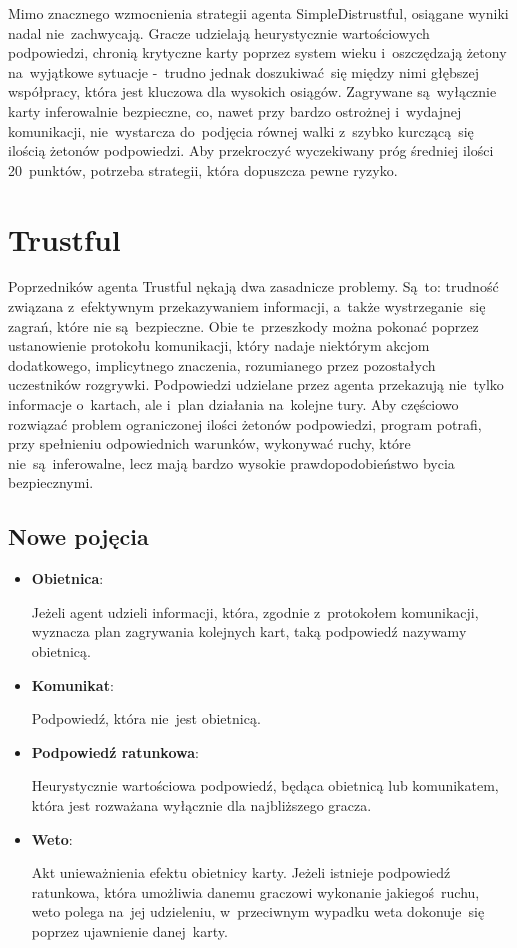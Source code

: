 \documentclass[declaration,shortabstract,inz]{iithesis}
\begin{document}
Mimo znacznego wzmocnienia strategii agenta SimpleDistrustful, osiągane wyniki nadal nie~zachwycają. Gracze udzielają heurystycznie wartościowych podpowiedzi, chronią krytyczne karty poprzez system wieku i~oszczędzają żetony na~wyjątkowe sytuacje -~trudno jednak doszukiwać~się między nimi głębszej współpracy, która jest kluczowa dla wysokich osiągów. Zagrywane są~wyłącznie karty inferowalnie bezpieczne, co, nawet przy bardzo ostrożnej i~wydajnej komunikacji, nie~wystarcza do~podjęcia równej walki z~szybko kurczącą~się ilością żetonów podpowiedzi. Aby przekroczyć wyczekiwany próg średniej ilości 20~punktów, potrzeba strategii, która dopuszcza pewne ryzyko.

\section{Trustful}

Poprzedników agenta Trustful nękają dwa zasadnicze problemy. Są~to: trudność związana z~efektywnym przekazywaniem informacji, a~także wystrzeganie~się zagrań, które nie są~bezpieczne. Obie te~przeszkody można pokonać poprzez ustanowienie protokołu komunikacji, który nadaje niektórym akcjom dodatkowego, implicytnego znaczenia, rozumianego przez pozostałych uczestników rozgrywki. Podpowiedzi udzielane przez agenta przekazują nie~tylko informacje o~kartach, ale i~plan działania na~kolejne tury. Aby częściowo rozwiązać problem ograniczonej ilości żetonów podpowiedzi, program potrafi, przy spełnieniu odpowiednich warunków, wykonywać ruchy, które nie~są~inferowalne, lecz mają bardzo wysokie prawdopodobieństwo bycia bezpiecznymi.

\subsection*{Nowe pojęcia}

\begin{itemize}
	\item \textbf{Obietnica}:
	
	Jeżeli agent udzieli informacji, która, zgodnie z~protokołem komunikacji, wyznacza plan zagrywania kolejnych kart, taką podpowiedź nazywamy obietnicą.
	
	\item \textbf{Komunikat}:
	
	Podpowiedź, która nie~jest obietnicą.
	
	\item \textbf{Podpowiedź ratunkowa}:
	
	Heurystycznie wartościowa podpowiedź, będąca obietnicą lub komunikatem, która jest rozważana wyłącznie dla najbliższego gracza.
	
	\item \textbf{Weto}:
	
	Akt unieważnienia efektu obietnicy karty. Jeżeli istnieje podpowiedź ratunkowa, która umożliwia danemu graczowi wykonanie jakiegoś ruchu, weto polega na~jej udzieleniu, w~przeciwnym wypadku weta dokonuje~się poprzez ujawnienie danej karty.

\end{itemize}
\end{document}

